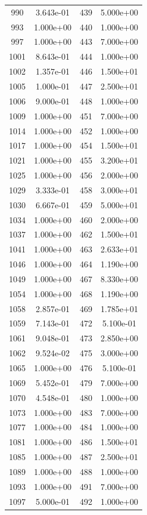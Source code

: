 \documentclass[12pt]{article}
\begin{document}
\begin{longtable}{@{}cccc@{}}
990 & 3.643e-01 & 439 & 5.000e+00 \\
993 & 1.000e+00 & 440 & 1.000e+00 \\
997 & 1.000e+00 & 443 & 7.000e+00 \\
1001 & 8.643e-01 & 444 & 1.000e+00 \\
1002 & 1.357e-01 & 446 & 1.500e+01 \\
1005 & 1.000e-01 & 447 & 2.500e+01 \\
1006 & 9.000e-01 & 448 & 1.000e+00 \\
1009 & 1.000e+00 & 451 & 7.000e+00 \\
1014 & 1.000e+00 & 452 & 1.000e+00 \\
1017 & 1.000e+00 & 454 & 1.500e+01 \\
1021 & 1.000e+00 & 455 & 3.200e+01 \\
1025 & 1.000e+00 & 456 & 2.000e+00 \\
1029 & 3.333e-01 & 458 & 3.000e+01 \\
1030 & 6.667e-01 & 459 & 5.000e+01 \\
1034 & 1.000e+00 & 460 & 2.000e+00 \\
1037 & 1.000e+00 & 462 & 1.500e+01 \\
1041 & 1.000e+00 & 463 & 2.633e+01 \\
1046 & 1.000e+00 & 464 & 1.190e+00 \\
1049 & 1.000e+00 & 467 & 8.330e+00 \\
1054 & 1.000e+00 & 468 & 1.190e+00 \\
1058 & 2.857e-01 & 469 & 1.785e+01 \\
1059 & 7.143e-01 & 472 & 5.100e-01 \\
1061 & 9.048e-01 & 473 & 2.850e+00 \\
1062 & 9.524e-02 & 475 & 3.000e+00 \\
1065 & 1.000e+00 & 476 & 5.100e-01 \\
1069 & 5.452e-01 & 479 & 7.000e+00 \\
1070 & 4.548e-01 & 480 & 1.000e+00 \\
1073 & 1.000e+00 & 483 & 7.000e+00 \\
1077 & 1.000e+00 & 484 & 1.000e+00 \\
1081 & 1.000e+00 & 486 & 1.500e+01 \\
1085 & 1.000e+00 & 487 & 2.500e+01 \\
1089 & 1.000e+00 & 488 & 1.000e+00 \\
1093 & 1.000e+00 & 491 & 7.000e+00 \\
1097 & 5.000e-01 & 492 & 1.000e+00 \\

\end{longtable}
\end{document}
